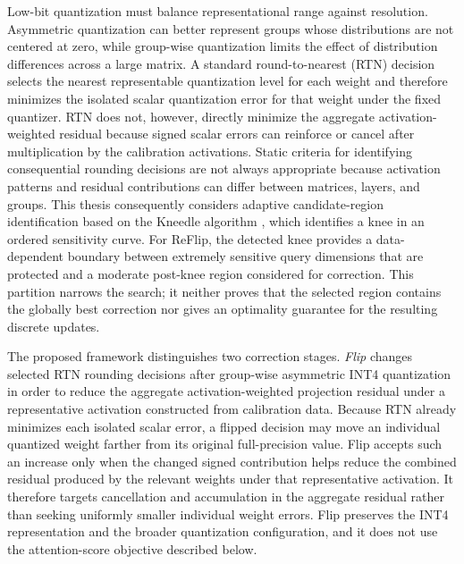 Low-bit quantization must balance representational range against resolution. Asymmetric quantization can better represent groups whose distributions are not centered at zero, while group-wise quantization limits the effect of distribution differences across a large matrix. A standard round-to-nearest (RTN) decision selects the nearest representable quantization level for each weight and therefore minimizes the isolated scalar quantization error for that weight under the fixed quantizer. RTN does not, however, directly minimize the aggregate activation-weighted residual because signed scalar errors can reinforce or cancel after multiplication by the calibration activations. Static criteria for identifying consequential rounding decisions are not always appropriate because activation patterns and residual contributions can differ between matrices, layers, and groups. This thesis consequently considers adaptive candidate-region identification based on the Kneedle algorithm \cite{satopaa2011kneedle}, which identifies a knee in an ordered sensitivity curve. For ReFlip, the detected knee provides a data-dependent boundary between extremely sensitive query dimensions that are protected and a moderate post-knee region considered for correction. This partition narrows the search; it neither proves that the selected region contains the globally best correction nor gives an optimality guarantee for the resulting discrete updates.

The proposed framework distinguishes two correction stages. \emph{Flip} changes selected RTN rounding decisions after group-wise asymmetric INT4 quantization in order to reduce the aggregate activation-weighted projection residual under a representative activation constructed from calibration data. Because RTN already minimizes each isolated scalar error, a flipped decision may move an individual quantized weight farther from its original full-precision value. Flip accepts such an increase only when the changed signed contribution helps reduce the combined residual produced by the relevant weights under that representative activation. It therefore targets cancellation and accumulation in the aggregate residual rather than seeking uniformly smaller individual weight errors. Flip preserves the INT4 representation and the broader quantization configuration, and it does not use the attention-score objective described below.

